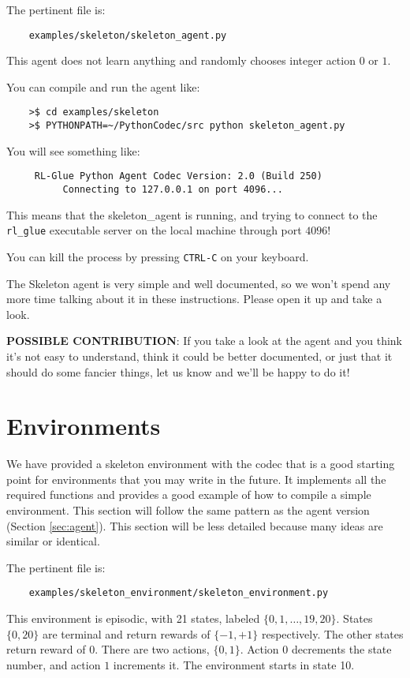 \documentclass[11pt]{article}
\begin{document}
The pertinent file is:
\begin{verbatim}
	examples/skeleton/skeleton_agent.py
\end{verbatim}

This agent does not learn anything and randomly chooses integer action $0$ or $1$.  

You can compile and run the agent like:
\begin{verbatim}
	>$ cd examples/skeleton
	>$ PYTHONPATH=~/PythonCodec/src python skeleton_agent.py
\end{verbatim}

You will see something like:
\begin{verbatim}
     RL-Glue Python Agent Codec Version: 2.0 (Build 250)
          Connecting to 127.0.0.1 on port 4096...
\end{verbatim}

This means that the skeleton\_agent is running, and trying to connect to the \texttt{rl\_glue} executable server on the local machine through port $4096$! 

You can kill the process by pressing \texttt{CTRL-C} on your keyboard.

The Skeleton agent is very simple and well documented, so we won't spend any more time talking about it in these instructions.
Please open it up and take a look.

\textbf{POSSIBLE CONTRIBUTION}: If you take a look at the agent and you think it's not easy to understand, think it could be better documented, 
or just that it should do some fancier things, let us know and we'll be happy to do it!


\section{Environments}
We have provided a skeleton environment with the codec that is a good starting point for environments that you may write in the future.
It implements all the required functions and provides a good example of how to compile a simple environment.  This section will follow the same 
pattern as the agent version (Section \ref{sec:agent}).  This section will be less detailed because many ideas are similar or identical.

The pertinent file is:
\begin{verbatim}
	examples/skeleton_environment/skeleton_environment.py
\end{verbatim}

This environment is episodic, with 21 states, labeled $\{0, 1,\ldots,19,20\}$. States $\{0, 20\}$ are terminal and return rewards of $\{-1, +1\}$ respectively.  The other states return reward of $0$.
There are two actions, $\{0, 1\}$.  Action $0$ decrements the state number, and action $1$ increments it. The environment starts in state 10.
\end{document}
